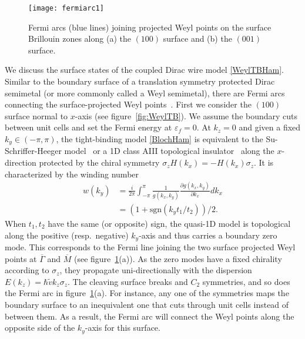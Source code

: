 \begin{figure}[htbp]
\centering\texttt{[image: fermiarc1]}
\caption{Fermi arcs (blue lines) joining projected Weyl points on the surface Brillouin zones along (a) the $(100)$ surface and (b) the $(001)$ surface.}\label{fig:fermiarc1}
\end{figure}
We discuss the surface states of the coupled Dirac wire model \eqref{WeylTBHam}. Similar to the boundary surface of a translation symmetry protected Dirac semimetal (or more commonly called a Weyl semimetal), there are Fermi arcs connecting the surface-projected Weyl points~\cite{WanVishwanathSavrasovPRB11,Ashvin_Weyl_review,RMP}. First we consider the $(100)$ surface normal to $x$-axis (see figure~\ref{fig:WeylTB}). We assume the boundary cuts between unit cells and set the Fermi energy at $\varepsilon_f=0$. At $k_z=0$ and given a fixed $k_y\in(-\pi,\pi)$, the tight-binding model \eqref{BlochHam} is equivalent to the Su-Schriffer-Heeger model~\cite{SSH} or a 1D class AIII topological insulator~\cite{SchnyderRyuFurusakiLudwig08,Kitaevtable08} along the $x$-direction protected by the chiral symmetry $\sigma_zH(k_x)=-H(k_x)\sigma_z$. It is characterized by the winding number \begin{align}w(k_y)&=\frac{i}{2\pi}\int_{-\pi}^\pi \frac{1}{g(k_x,k_y)}\frac{\partial g(k_x,k_y)}{\partial k_x}dk_x\\&=\left(1+\mathrm{sgn}(k_y t_1/t_2)\right)/2.\nonumber\end{align} When $t_1,t_2$ have the same (or opposite) sign, the quasi-1D model is topological along the positive (resp.~negative) $k_y$-axis and thus carries a boundary zero mode. This corresponds to the Fermi line joining the two surface projected Weyl points at $\overline{\Gamma}$ and $\overline{M}$ (see figure~\ref{fig:fermiarc1}(a)). As the zero modes have a fixed chirality according to $\sigma_z$, they propagate uni-directionally with the dispersion $E(k_z)=\hbar\tilde{v}k_z\sigma_z$. The cleaving surface breaks \AFTR and $C_2$ symmetries, and so does the Fermi arc in figure~\ref{fig:fermiarc1}(a). For instance, any one of the \AFTR symmetries maps the boundary surface to an inequivalent one that cuts through unit cells instead of between them. As a result, the Fermi arc will connect the Weyl points along the opposite side of the $k_y$-axis for this surface. 


